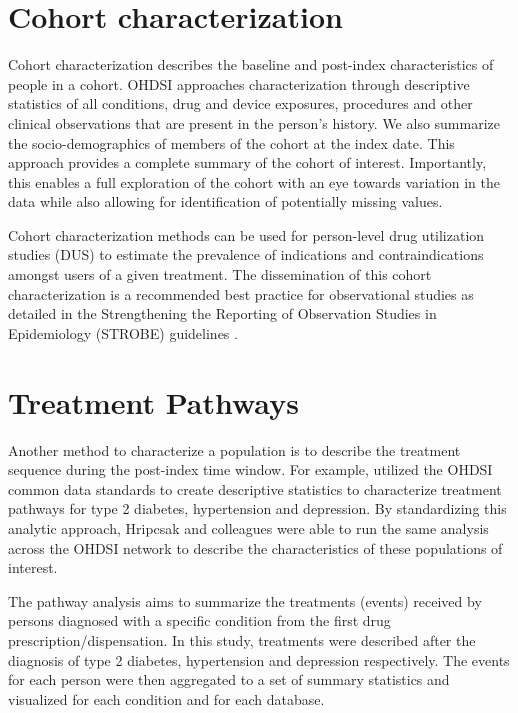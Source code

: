 \documentclass[11pt]{book}
\theoremstyle{definition}
\theoremstyle{definition}
\theoremstyle{definition}
\theoremstyle{remark}
\begin{document}
\hypertarget{cohort-characterization}{%
\section{Cohort characterization}\label{cohort-characterization}}

Cohort characterization describes the baseline and post-index characteristics of people in a cohort. OHDSI approaches characterization through descriptive statistics of all conditions, drug and device exposures, procedures and other clinical observations that are present in the person's history. We also summarize the socio-demographics of members of the cohort at the index date. This approach provides a complete summary of the cohort of interest. Importantly, this enables a full exploration of the cohort with an eye towards variation in the data while also allowing for identification of potentially missing values.

Cohort characterization methods can be used for person-level drug utilization studies (DUS) to estimate the prevalence of indications and contraindications amongst users of a given treatment. The dissemination of this cohort characterization is a recommended best practice for observational studies as detailed in the Strengthening the Reporting of Observation Studies in Epidemiology (STROBE) guidelines \citep{VONELM2008344}.   

\hypertarget{treatment-pathways}{%
\section{Treatment Pathways}\label{treatment-pathways}}

Another method to characterize a population is to describe the treatment sequence during the post-index time window. For example, \citet{Hripcsak7329} utilized the OHDSI common data standards to create descriptive statistics to characterize treatment pathways for type 2 diabetes, hypertension and depression. By standardizing this analytic approach, Hripcsak and colleagues were able to run the same analysis across the OHDSI network to describe the characteristics of these populations of interest.   

The pathway analysis aims to summarize the treatments (events) received by persons diagnosed with a specific condition from the first drug prescription/dispensation. In this study, treatments were described after the diagnosis of type 2 diabetes, hypertension and depression respectively. The events for each person were then aggregated to a set of summary statistics and visualized for each condition and for each database.
\end{document}
